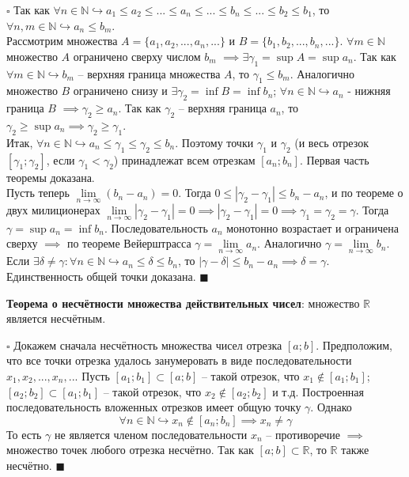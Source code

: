 \documentclass[12pt, a4paper, reqno]{article}
\begin{document}
    $\square$ Так как $\forall n\in\mathbb{N} \hookrightarrow a_1 \leq a_2 \leq ... \leq a_n
    \leq ... \leq b_n \leq ... \leq b_2 \leq b_1$, то $\forall n, m\in\mathbb{N} \hookrightarrow
    a_n \leq b_m$.\\
    Рассмотрим множества $A = \{a_1, a_2, ..., a_n, ...\}$ и $B = \{b_1, b_2, ..., b_n, ...\}$.
    $\forall m\in\mathbb{N}$ множество $A$ ограничено сверху числом $b_m$ $\implies \exists
    \gamma_1 = \sup A = \sup a_n$. Так как $\forall m\in\mathbb{N} \hookrightarrow b_m$ -- верхняя
    граница множества $A$, то $\gamma_1 \leq b_m$. Аналогично множество $B$ ограничено снизу и
    $\exists \gamma_2 = \inf B = \inf b_n$; $\forall n\in\mathbb{N} \hookrightarrow a_n$ - нижняя
    граница $B$ $\implies \gamma_2 \geq a_n$. Так как $\gamma_2$ -- верхняя граница $a_n$, то
    $\gamma_2 \geq \sup a_n \implies \gamma_2 \geq \gamma_1$.\\
    Итак, $\forall n\in\mathbb{N} \hookrightarrow a_n \leq \gamma_1 \leq \gamma_2 \leq b_n$. Поэтому
    точки $\gamma_1$ и $\gamma_2$ (и весь отрезок $[\gamma_1; \gamma_2]$, если $\gamma_1 < \gamma_2$)
    принадлежат всем отрезкам $[a_n; b_n]$. Первая часть теоремы доказана.\\
    Пусть теперь $\lim\limits_{n\to \infty} (b_n - a_n) = 0$. Тогда $0 \leq |\gamma_2 - \gamma_1|
    \leq b_n - a_n$, и по теореме о двух милиционерах $\lim\limits_{n\to \infty} |\gamma_2 -
    \gamma_1| = 0 \implies |\gamma_2 - \gamma_1| = 0 \implies \gamma_1 = \gamma_2 = \gamma$. Тогда
    $\gamma = \sup a_n = \inf b_n$. Последовательность $a_n$ монотонно возрастает и ограничена сверху
    $\implies$ по теореме Вейерштрасса $\gamma = \lim\limits_{n\to\infty}a_n$. Аналогично $\gamma =
    \lim\limits_{n\to\infty}b_n$.\\
    Если $\exists\delta \neq \gamma: \forall n\in\mathbb{N} \hookrightarrow a_n \leq \delta
    \leq b_n$, то $|\gamma - \delta| \leq b_n - a_n \implies \delta = \gamma$. Единственность общей
    точки доказана. $\blacksquare$

    \textbf{Теорема о несчётности множества действительных чисел}: множество $\mathbb {R}$ является
    несчётным.

    $\square$ Докажем сначала несчётность множества чисел отрезка $[a; b]$. Предположим, что все
    точки отрезка удалось занумеровать в виде последовательности $x_1, x_2, ..., x_n, ...$  Пусть
    $[a_1; b_1] \subset [a; b]$ -- такой отрезок, что $x_1 \not\in [a_1; b_1]$; $[a_2; b_2] \subset
    [a_1; b_1]$ -- такой отрезок, что $x_2 \not\in [a_2; b_2]$ и т.д. Построенная последовательность
    вложенных отрезков имеет общую точку $\gamma$. Однако
    \begin{equation*}
        \forall n\in\mathbb{N} \hookrightarrow x_n \not\in [a_n; b_n] \implies x_n \neq \gamma
    \end{equation*}
    То есть $\gamma$ не является членом последовательности $x_n$ -- противоречие $\implies$ множество
    точек любого отрезка несчётно. Так как $[a; b] \subset \mathbb{R}$, то $\mathbb{R}$ также
    несчётно. $\blacksquare$
\end{document}
